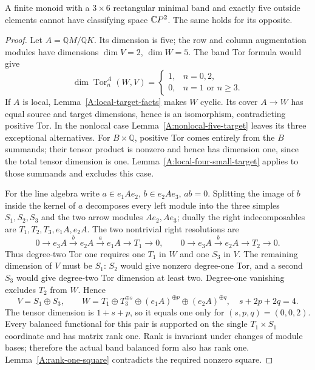 \begin{proposition}
\label{A:three-by-six-CP2}
A finite monoid with a $3\times6$ rectangular minimal band
and exactly five outside elements cannot have classifying
space $\mathbb{C}P^2$. The same holds for its opposite.
\end{proposition}
\begin{proof}
Let $A=\mathbb QM/\mathbb QK$. Its dimension is five;
the row and column augmentation modules have dimensions
$\dim V=2$, $\dim W=5$. The band Tor formula would give
\[
 \dim\operatorname{Tor}_n^A(W,V)=
 \begin{cases}1,&n=0,2,\\0,&n=1\text{ or }n\geq3.\end{cases}
\]
If $A$ is local, Lemma~\ref{A:local-target-facts}
makes $W$ cyclic. Its cover $A\to W$ has equal
source and target dimensions, hence is an isomorphism,
contradicting positive Tor. In the nonlocal case
Lemma~\ref{A:nonlocal-five-target} leaves its three
exceptional alternatives. For $B\times\mathbb Q$,
positive Tor comes entirely from the $B$ summands;
their tensor product is nonzero and hence has dimension
one, since the total tensor dimension is one.
Lemma~\ref{A:local-four-small-target} applies to
those summands and excludes this case.

For the line algebra write $a\in e_1Ae_2$,
$b\in e_2Ae_3$, $ab=0$.
Splitting the image of $b$ inside the kernel of $a$
decomposes every left module into the three simples
$S_1,S_2,S_3$ and the two arrow modules $Ae_2,Ae_3$;
dually the right indecomposables are
$T_1,T_2,T_3,e_1A,e_2A$.
The two nontrivial right resolutions are
\[
 0\to e_3A\xrightarrow{b}e_2A\xrightarrow{a}e_1A
   \to T_1\to0,\qquad
 0\to e_3A\xrightarrow{b}e_2A\to T_2\to0.
\]
Thus degree-two Tor one requires one $T_1$ in $W$
and one $S_3$ in $V$. The remaining dimension of
$V$ must be $S_1$: $S_2$ would give nonzero degree-one
Tor, and a second $S_3$ would give degree-two Tor
dimension at least two. Degree-one vanishing excludes
$T_2$ from $W$. Hence
\[
 V=S_1\oplus S_3,\qquad
 W=T_1\oplus T_3^{\oplus s}\oplus(e_1A)^{\oplus p}
                    \oplus(e_2A)^{\oplus q},\quad
 s+2p+2q=4.
\]
The tensor dimension is $1+s+p$, so it equals one
only for $(s,p,q)=(0,0,2)$.
Every balanced functional for this pair is supported
on the single $T_1\times S_1$ coordinate and has
matrix rank one. Rank is invariant under changes
of module bases; therefore the actual band balanced
form also has rank one. Lemma~\ref{A:rank-one-square}
contradicts the required nonzero square.


\end{proof}
